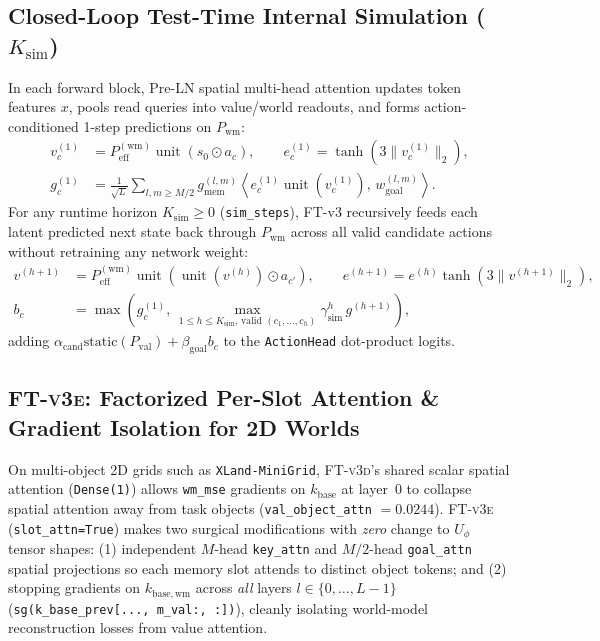 \documentclass[11pt]{article}
\newcommand{\unit}[1]{\operatorname{unit}\!\left(#1\right)}
\newcommand{\Uphi}{U_\phi}
\newcommand{\Pval}{P_{\mathrm{val}}}
\newcommand{\Pwm}{P_{\mathrm{wm}}}
\newcommand{\Ksim}{K_{\mathrm{sim}}}
\newcommand{\ftd}{\textsc{FT-v3d}}
\newcommand{\fte}{\textsc{FT-v3e}}
\begin{document}
\subsection{Closed-Loop Test-Time Internal Simulation (\texorpdfstring{$\Ksim$}{K\_sim})}
In each forward block, Pre-LN spatial multi-head attention updates token features $x$, pools read queries into value/world readouts, and forms action-conditioned 1-step predictions on $\Pwm$:
\begin{align}
v_c^{(1)} &= P_{\text{eff}}^{(\mathrm{wm})} \unit{s_0 \odot a_c}, \qquad
e_c^{(1)} = \tanh\!\left(3\lVert v_c^{(1)} \rVert_2\right), \nonumber \\
g_c^{(1)} &= \frac{1}{\sqrt{L}} \sum_{l, m \ge M/2} g_{\text{mem}}^{(l,m)} \left\langle e_c^{(1)} \unit{v_c^{(1)}},\, w_{\text{goal}}^{(l,m)} \right\rangle.
\label{eq:sim1}
\end{align}
For any runtime horizon $\Ksim \ge 0$ (\texttt{sim\_steps}), FT-v3 recursively feeds each latent predicted next state back through $\Pwm$ across all valid candidate actions without retraining any network weight:
\begin{align}
v^{(h+1)} &= P_{\text{eff}}^{(\mathrm{wm})} \unit{\unit{v^{(h)}} \odot a_{c'}}, \qquad
e^{(h+1)} = e^{(h)} \tanh\!\left(3\lVert v^{(h+1)} \rVert_2\right), \nonumber \\
b_c &= \max\!\left(g_c^{(1)},\, \max_{1 \le h \le \Ksim,\, \text{valid }(c_1,\dots,c_h)} \gamma_{\mathrm{sim}}^h\, g^{(h+1)}\right),
\label{eq:simk}
\end{align}
adding $\alpha_{\text{cand}} \mathrm{static}(\Pval) + \beta_{\text{goal}} b_c$ to the \texttt{ActionHead} dot-product logits.

\subsection{\fte{}: Factorized Per-Slot Attention \& Gradient Isolation for 2D Worlds}
On multi-object 2D grids such as \texttt{XLand-MiniGrid}, \ftd{}'s shared scalar spatial attention (\texttt{Dense(1)}) allows \texttt{wm\_mse} gradients on $k_{\text{base}}$ at layer~0 to collapse spatial attention away from task objects (\texttt{val\_object\_attn} $= 0.0244$). \fte{} (\texttt{slot\_attn=True}) makes two surgical modifications with \emph{zero} change to $\Uphi$ tensor shapes: (1) independent $M$-head \texttt{key\_attn} and $M/2$-head \texttt{goal\_attn} spatial projections so each memory slot attends to distinct object tokens; and (2) stopping gradients on $k_{\mathrm{base},\mathrm{wm}}$ across \emph{all} layers $l \in \{0,\dots,L-1\}$ (\texttt{sg(k\_base\_prev[..., m\_val:, :])}), cleanly isolating world-model reconstruction losses from value attention.
\end{document}
